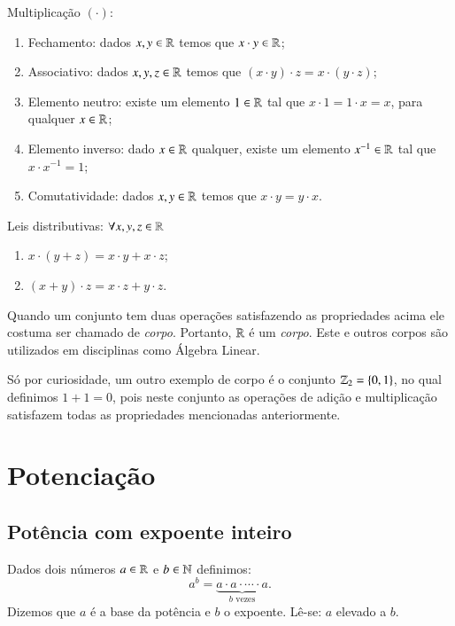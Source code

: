   Multiplicação $(\cdot)$:
 \begin{enumerate}[1)]
 \item Fechamento: dados $x, y \in \mathbb{R}$ temos que $x \cdot y \in \mathbb{R}$;
 \item Associativo: dados $x, y, z \in \mathbb{R}$ temos que $(x \cdot y) \cdot z= x \cdot (y \cdot z)$;
 \item Elemento neutro: existe um elemento $1 \in \mathbb{R}$ tal que $x \cdot 1= 1 \cdot x= x$, para qualquer $x \in \mathbb{R}$;
 \item Elemento inverso: dado $x \in \mathbb{R}$ qualquer, existe um elemento $x^{-1} \in \mathbb{R}$ tal que $x \cdot x^{-1}= 1$;
 \item Comutatividade: dados $x, y \in \mathbb{R}$ temos que $x \cdot y= y \cdot x$. 
 \end{enumerate}
 
  Leis distributivas: $\forall x, y, z \in \mathbb{R}$
 \begin{enumerate}[1)]
 \item $x \cdot (y + z)= x \cdot y + x \cdot z$;
 \item $(x + y) \cdot z= x \cdot z + y \cdot z$.
 \end{enumerate}
 
   Quando um conjunto tem duas operações satisfazendo as propriedades acima ele costuma ser chamado de \emph{corpo}. Portanto, $\mathbb{R}$ é um \emph{corpo}. Este e outros corpos são utilizados em disciplinas como Álgebra Linear.
   
   Só por curiosidade, um outro exemplo de corpo é o conjunto $\mathbb{Z}_2= \{0, 1\}$, no qual definimos $1+1=0$, pois neste conjunto as operações de adição e multiplicação satisfazem todas as propriedades mencionadas anteriormente.

 \chapter{Potenciação}

 \section{Potência com expoente inteiro}

 \vskip0.3cm

 \colorbox{azul}{
 \begin{minipage}{0.9\linewidth}
 \begin{center}
  Dados dois números $a \in \mathbb{R}$ e $b \in \mathbb{N}$ definimos:
 \[a^b= \underbrace{a \cdot a \cdot \cdots \cdot a}_{b \text{ vezes}} .\]
  Dizemos que $a$ é a base da potência e $b$ o expoente. Lê-se: $a$ elevado a $b$.
 \end{center}
 \end{minipage}}

